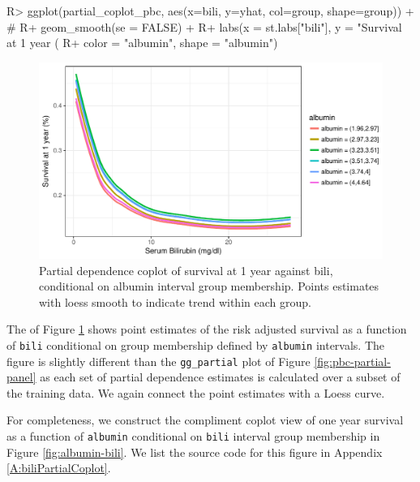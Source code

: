 \documentclass[article]{jss}
\begin{document}
\begin{Schunk}
\begin{Sinput}
R> ggplot(partial_coplot_pbc, aes(x=bili, y=yhat, col=group, shape=group)) + #
R+   geom_smooth(se = FALSE) +
R+   labs(x = st.labs["bili"], y = "Survival at 1 year (%
R+        color = "albumin", shape = "albumin")
\end{Sinput}
\begin{figure}[!htb]

{\centering \includegraphics{fig-rfs/rfs-bili-albumin-1} 

}

\caption[Partial dependence coplot of survival at 1 year against bili, conditional on albumin interval group membership]{Partial dependence coplot of survival at 1 year against bili, conditional on albumin interval group membership. Points estimates with loess smooth to indicate trend within each group.}\label{fig:bili-albumin}
\end{figure}
\end{Schunk}

The  of Figure \ref{fig:bili-albumin} shows
point estimates of the risk adjusted survival as a function of
\texttt{bili} conditional on group membership defined by
\texttt{albumin} intervals. The figure is slightly different than the
\texttt{gg\_partial} plot of Figure \ref{fig:pbc-partial-panel} as each
set of partial dependence estimates is calculated over a subset of the
training data. We again connect the point estimates with a Loess curve.

For completeness, we construct the compliment coplot view of one year
survival as a function of \texttt{albumin} conditional on \texttt{bili}
interval group membership in Figure \ref{fig:albumin-bili}. We list the
source code for this figure in Appendix \ref{A:biliPartialCoplot}.
\end{document}
